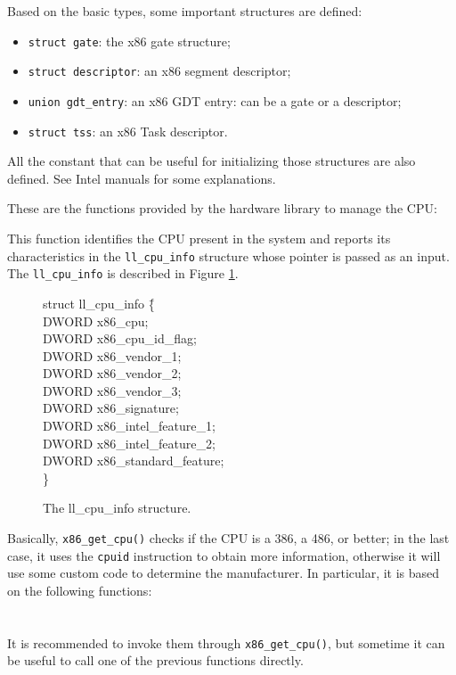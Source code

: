 \documentclass[a4paper]{report}
\begin{document}
Based on the basic types, some important structures are defined:
\begin{itemize}
	\item {\tt struct gate}: the x86 gate structure;
	\item {\tt struct descriptor}: an x86 segment descriptor;
	\item {\tt union gdt\_entry}: an x86 GDT entry: can be a
		gate or a descriptor;
	\item {\tt struct tss}: an x86 Task descriptor.
\end{itemize}
All the constant that can be useful for initializing those structures are
also defined. See Intel manuals for some explanations.

These are the functions provided by the hardware library to manage
the CPU:


This function identifies the CPU present in the system and reports
its characteristics in the {\tt ll\_cpu\_info} structure whose pointer is
passed as an input. The {\tt ll\_cpu\_info} is described in Figure
\ref{fig:cpuinfo}.
\begin{figure}
\begin{tt}
\begin{tabbing}
struct ll\_cpu\_info \= \{					\\
\>	DWORD x86\_cpu;						\\
\>	DWORD x86\_cpu\_id\_flag;					\\
\>	DWORD x86\_vendor\_1;					\\
\>	DWORD x86\_vendor\_2;					\\
\>	DWORD x86\_vendor\_3;					\\
\>	DWORD x86\_signature;					\\
\>	DWORD x86\_intel\_feature\_1;				\\
\>	DWORD x86\_intel\_feature\_2;				\\
\>	DWORD x86\_standard\_feature;				\\
\}
\end{tabbing}
\end{tt}
\label{fig:cpuinfo}
\caption{The ll\_cpu\_info structure.}
\end{figure}

Basically, {\tt x86\_get\_cpu()} checks if the CPU is a 386, a 486, or
better; in the last case, it uses the {\tt cpuid} instruction to obtain
more information, otherwise it will use some custom code to determine the
manufacturer. In particular, it is based on the following functions:
			\\
			\\
			\\
It is recommended to invoke them through {\tt x86\_get\_cpu()}, but
sometime it can be useful to call one of the previous functions directly.
\end{document}
